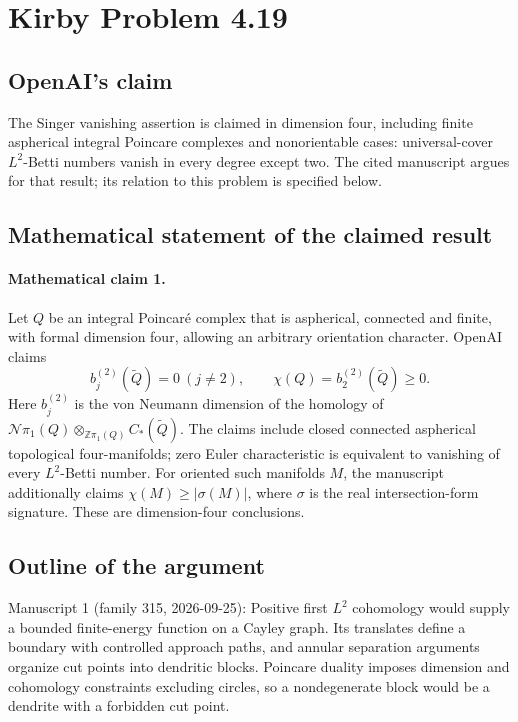 \documentclass[11pt]{article}
\begin{document}
\section*{Kirby Problem 4.19}

\subsection{OpenAI's claim}
The Singer vanishing assertion is claimed in dimension four, including finite aspherical integral Poincare complexes and nonorientable cases: universal-cover \(L^2\)-Betti numbers vanish in every degree except two. The cited manuscript argues for that result; its relation to this problem is specified below.

\subsection{Mathematical statement of the claimed result}
\paragraph{Mathematical claim 1.} Let $Q$ be an integral Poincaré complex that is aspherical, connected and finite, with formal dimension four, allowing an arbitrary orientation character. OpenAI claims
\[
b_j^{(2)}(\widetilde Q)=0\ (j\ne2),\qquad
\chi(Q)=b_2^{(2)}(\widetilde Q)\ge0.
\]
Here $b_j^{(2)}$ is the von Neumann dimension of the homology of $\mathcal N\pi_1(Q)\otimes_{\mathbb Z\pi_1(Q)}C_*(\widetilde Q)$. The claims include closed connected aspherical topological four-manifolds; zero Euler characteristic is equivalent to vanishing of every $L^2$-Betti number. For oriented such manifolds $M$, the manuscript additionally claims $\chi(M)\ge|\sigma(M)|$, where $\sigma$ is the real intersection-form signature. These are dimension-four conclusions.

\subsection{Outline of the argument}
Manuscript 1 (family 315, 2026-09-25): Positive first \(L^2\) cohomology would supply a bounded finite-energy function on a Cayley graph. Its translates define a boundary with controlled approach paths, and annular separation arguments organize cut points into dendritic blocks. Poincare duality imposes dimension and cohomology constraints excluding circles, so a nondegenerate block would be a dendrite with a forbidden cut point.
\end{document}

